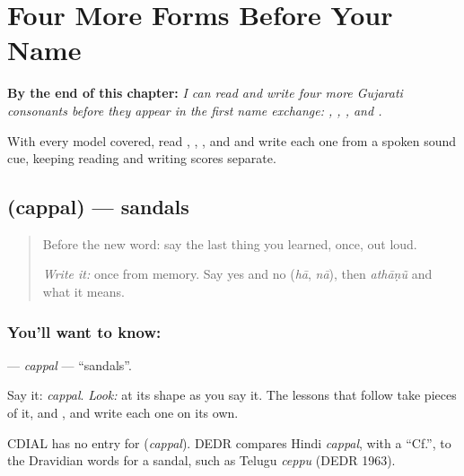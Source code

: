 
\chapter{Four More Forms Before Your Name}
\label{ch:gu-first-use-forms-b}

\begin{chapteropening}
\textbf{By the end of this chapter:} \emph{I can read and write four more Gujarati consonants before they appear in the first name exchange: , , , and .}

With every model covered, read , , , and  and write each one from a spoken sound cue, keeping reading and writing scores separate.
\end{chapteropening}

\section[\texorpdfstring{\gu{ચપ્પલ} (cappal)}{ચપ્પલ (cappal)}]{ (cappal) — sandals}

\label{lesson:GU-C05-chappal}



\begin{quote}
Before the new word: say the last thing you learned, once, out loud.

\emph{Write it:} \textbf{} once from memory. Say yes and no (\emph{hā}, \emph{nā}), then \emph{athāṇũ} and what it means.
\end{quote}

\subsection*{You'll want to know: }
\textbf{} — \emph{cappal} — \textquotedblleft{}sandals\textquotedblright{}.

Say it: \emph{cappal}. \emph{Look:} at its shape as you say it. The lessons that follow take pieces of it, \textbf{} and \textbf{}, and write each one on its own.

\begin{cousinweb}
CDIAL has no entry for \textbf{} (\emph{cappal}). DEDR compares Hindi \emph{cappal}, with a \textquotedblleft{}Cf.\textquotedblright{}, to the Dravidian words for a sandal, such as Telugu \emph{ceppu} (DEDR 1963).
\end{cousinweb}


